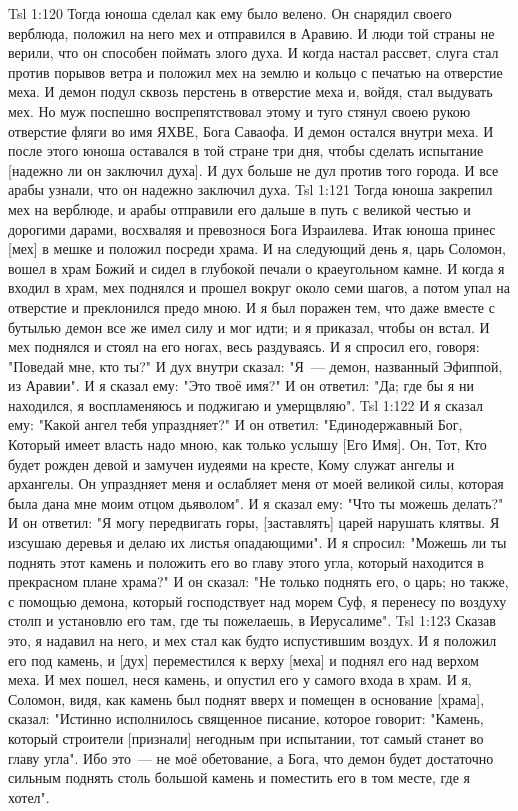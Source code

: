 \vs Tsl 1:120 
Тогда юноша сделал как ему было велено. Он снарядил своего верблюда, положил на него мех и отправился в Аравию. И люди той страны не верили, что он способен поймать злого духа. И когда настал рассвет, слуга стал против порывов ветра и положил мех на землю и кольцо с печатью на отверстие меха. И демон подул сквозь перстень в отверстие меха и, войдя, стал выдувать мех. Но муж поспешно воспрепятствовал этому и туго стянул своею рукою отверстие фляги во имя ЯХВЕ, Бога Саваофа. И демон остался внутри меха. И после этого юноша оставался в той стране три дня, чтобы сделать испытание [надежно ли он заключил духа]. И дух больше не дул против того города. И все арабы узнали, что он надежно заключил духа.
\vs Tsl 1:121 
Тогда юноша закрепил мех на верблюде, и арабы отправили его дальше в путь с великой честью и дорогими дарами, восхваляя и превознося Бога Израилева. Итак юноша принес [мех] в мешке и положил посреди храма. И на следующий день я, царь Соломон, вошел в храм Божий и сидел в глубокой печали о краеугольном камне. И когда я входил в храм, мех поднялся и прошел вокруг около семи шагов, а потом упал на отверстие и преклонился предо мною. И я был поражен тем, что даже вместе с бутылью демон все же имел силу и мог идти; и я приказал, чтобы он встал. И мех поднялся и стоял на его ногах, весь раздуваясь. И я спросил его, говоря: "Поведай мне, кто ты?" И дух внутри сказал: "Я~--- демон, названный Эфиппой, из Аравии". И я сказал ему: "Это твоё имя?" И он ответил: "Да; где бы я ни находился, я воспламеняюсь и поджигаю и умерщвляю".
\vs Tsl 1:122 
И я сказал ему: "Какой ангел тебя упраздняет?" И он ответил: "Единодержавный Бог, Который имеет власть надо мною, как только услышу [Его Имя]. Он, Тот, Кто будет рожден девой и замучен иудеями на кресте, Кому служат ангелы и архангелы. Он упраздняет меня и ослабляет меня от моей великой силы, которая была дана мне моим отцом дьяволом". И я сказал ему: "Что ты можешь делать?" И он ответил: "Я могу передвигать горы, [заставлять] царей нарушать клятвы. Я изсушаю деревья и делаю их листья опадающими". И я спросил: "Можешь ли ты поднять этот камень и положить его во главу этого угла, который находится в прекрасном плане храма?" И он сказал: "Не только поднять его, о царь; но также, с помощью демона, который господствует над морем Суф, я перенесу по воздуху столп и установлю его там, где ты пожелаешь, в Иерусалиме".
\vs Tsl 1:123 
Сказав это, я надавил на него, и мех стал как будто испустившим воздух. И я положил его под камень, и [дух] переместился к верху [меха] и поднял его над верхом меха. И мех пошел, неся камень, и опустил его у самого входа в храм. И я, Соломон, видя, как камень был поднят вверх и помещен в основание [храма], сказал: "Истинно исполнилось священное писание, которое говорит: "Камень, который строители [признали] негодным при испытании, тот самый станет во главу угла". Ибо это~--- не моё обетование, а Бога, что демон будет достаточно сильным поднять столь большой камень и поместить его в том месте, где я хотел".
